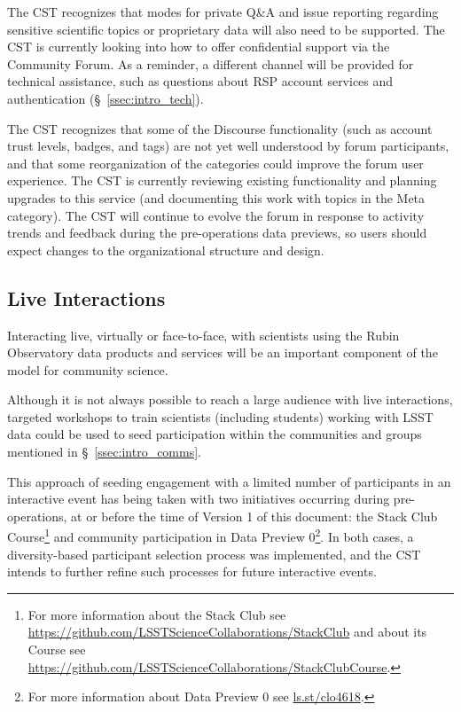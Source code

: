 \documentclass[DM,authoryear,toc]{lsstdoc}
\begin{document}

The CST recognizes that modes for private Q\&A and issue reporting regarding sensitive scientific topics or proprietary data will also need to be supported.
The CST is currently looking into how to offer confidential support via the Community Forum.
As a reminder, a different channel will be provided for technical assistance, such as questions about RSP account services and authentication (\S~\ref{ssec:intro_tech}).

The CST recognizes that some of the Discourse functionality (such as account trust levels, badges, and tags) are not yet well understood by forum participants, and that some reorganization of the categories could improve the forum user experience.
The CST is currently reviewing existing functionality and planning upgrades to this service (and documenting this work with topics in the Meta category).
The CST will continue to evolve the forum in response to activity trends and feedback during the pre-operations data previews, so users should expect changes to the organizational structure and design. 


\subsection{Live Interactions}\label{ssec:mod_interact}

Interacting live, virtually or face-to-face, with scientists using the Rubin Observatory data products and services will be an important component of the model for community science.

Although it is not always possible to reach a large audience with live interactions, targeted workshops to train scientists (including students) working with LSST data could be used to seed participation within the communities and groups mentioned in \S~\ref{ssec:intro_comms}.

This approach of seeding engagement with a limited number of participants in an interactive event has being taken with two initiatives occurring during pre-operations, at or before the time of Version 1 of this document: the Stack Club Course\footnote{For more information about the Stack Club see \url{https://github.com/LSSTScienceCollaborations/StackClub} and about its Course see \url{https://github.com/LSSTScienceCollaborations/StackClubCourse}.} and community participation in Data Preview 0\footnote{For more information about Data Preview 0 see \url{ls.st/clo4618}.}.
In both cases, a diversity-based participant selection process was implemented, and the CST intends to further refine such processes for future interactive events. 
\end{document}
